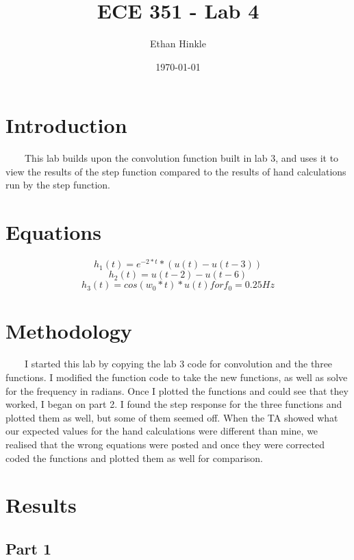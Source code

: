 \documentclass[11pt,a4]{article}
\title{ECE 351 - Lab 4}
\author{Ethan Hinkle}
\date{\today}
\begin{document}
\maketitle

\section{Introduction}
\ \ \ \ This lab builds upon the convolution function built in lab 3, and uses it to view the results of the step function compared to the results of hand calculations run by the step function.

\section{Equations}

\begin{equation}
h_1(t) = e^{-2*t}*(u(t)-u(t-3))
\end{equation}
\begin{equation}
h_2(t) = u(t-2)-u(t-6)
\end{equation}
\begin{equation}
h_3(t) = cos(w_0*t)*u(t) for f_0 = 0.25 Hz
\end{equation}

\section{Methodology}
\ \ \ \ I started this lab by copying the lab 3 code for convolution and the three functions. I modified the function code to take the new functions, as well as solve for the frequency in radians. Once I plotted the functions and could see that they worked, I began on part 2. I found the step response for the three functions and plotted them as well, but some of them seemed off. When the TA showed what our expected values for the hand calculations were different than mine, we realised that the wrong equations were posted and once they were corrected coded the functions and plotted them as well for comparison.

\section{Results}

\subsection{Part 1}
\end{document}
